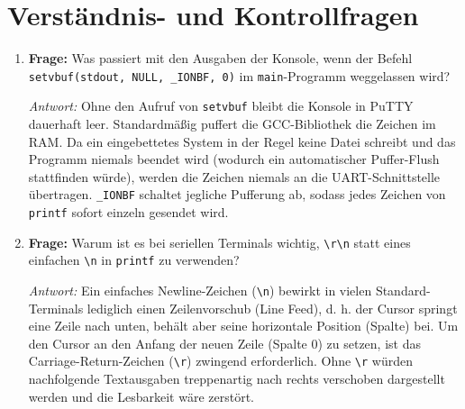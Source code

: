 \section{Verständnis- und Kontrollfragen}
\begin{enumerate}
    \item \textbf{Frage:} Was passiert mit den Ausgaben der Konsole, wenn der Befehl \lstinline|setvbuf(stdout, NULL, _IONBF, 0)| im \lstinline|main|-Programm weggelassen wird?
    
    \textit{Antwort:} Ohne den Aufruf von \lstinline|setvbuf| bleibt die Konsole in PuTTY dauerhaft leer. Standardmäßig puffert die GCC-Bibliothek die Zeichen im RAM. Da ein eingebettetes System in der Regel keine Datei schreibt und das Programm niemals beendet wird (wodurch ein automatischer Puffer-Flush stattfinden würde), werden die Zeichen niemals an die UART-Schnittstelle übertragen. \lstinline|_IONBF| schaltet jegliche Pufferung ab, sodass jedes Zeichen von \lstinline|printf| sofort einzeln gesendet wird.
    
    \item \textbf{Frage:} Warum ist es bei seriellen Terminals wichtig, \lstinline|\r\n| statt eines einfachen \lstinline|\n| in \lstinline|printf| zu verwenden?
    
    \textit{Antwort:} Ein einfaches Newline-Zeichen (\lstinline|\n|) bewirkt in vielen Standard-Terminals lediglich einen Zeilenvorschub (Line Feed), d. h. der Cursor springt eine Zeile nach unten, behält aber seine horizontale Position (Spalte) bei. Um den Cursor an den Anfang der neuen Zeile (Spalte 0) zu setzen, ist das Carriage-Return-Zeichen (\lstinline|\r|) zwingend erforderlich. Ohne \lstinline|\r| würden nachfolgende Textausgaben treppenartig nach rechts verschoben dargestellt werden und die Lesbarkeit wäre zerstört.
\end{enumerate}
